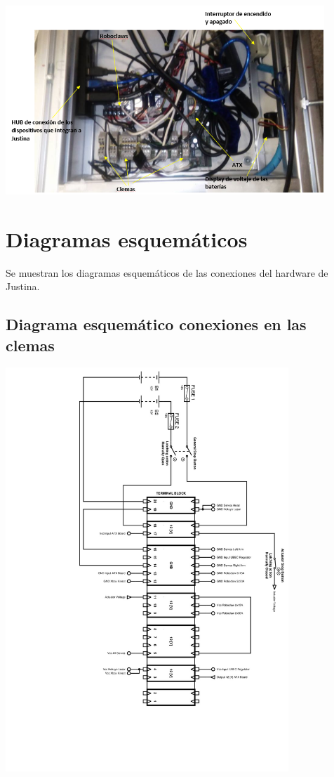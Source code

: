 \documentclass[user_manual.tex]{subfiles}
\begin{document}
\begin{center}
\includegraphics[width=0.9\textwidth]{Figures/Hardware/Diagramas/Base.png}
\label{fig:Hardware:Diagramas:Justina:Base}
\end{center}

\section{Diagramas esquemáticos}
Se muestran los diagramas esquemáticos de las conexiones del hardware de Justina.


\subsection{Diagrama esquemático conexiones en las clemas}

\begin{center}
\includegraphics[width=0.8\textwidth]{Figures/Hardware/Esquematicos/JustinaWiringDiagram.jpg}
\label{fig:Hardware:Partes:Diagrama:Esquematico:General}
\end{center}
\end{document}

